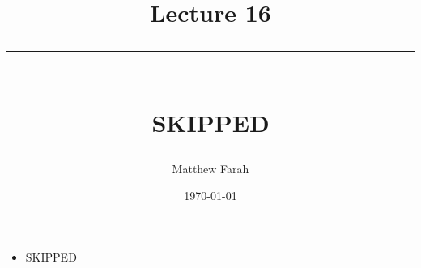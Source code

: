 \documentclass{article}
\date{
	\vspace{-.75em}
	{\large \today}
}
\title{
	\vspace*{-1.5em}
	{\Huge Lecture 16} \\
	\vspace{-1em}
	\rule{\textwidth/4}{.01em} \\
	\vspace{-.25em}
	{\Large SKIPPED}
	\vspace{-.75em}
}
\author{
	{\large Matthew Farah}
}
\begin{document}
\maketitle
\pagestyle{fancy}

\fi

\begin{itemize}
	\item SKIPPED
\end{itemize}

\ifdefined\iscombined
	\newpage
\else
	
\end{document}

